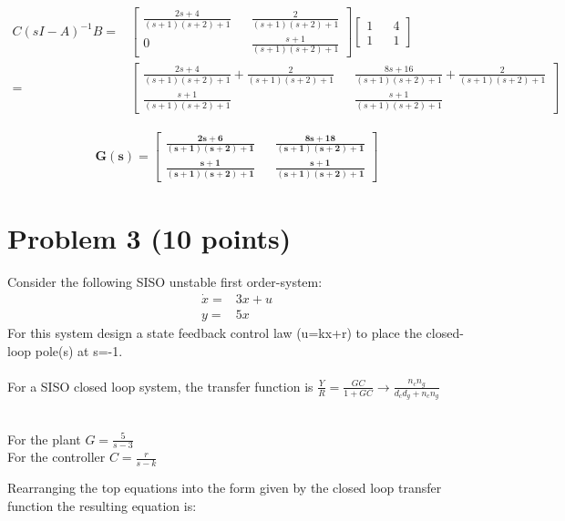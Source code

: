 \documentclass[paper=a4,margin, fontsize=11pt]{scrartcl} %
\numberwithin{equation}{section} %
\numberwithin{figure}{section} %
\numberwithin{table}{section} %
\begin{document}
\begin{align*}
C(sI-A)^{-1}B=&\begin{bmatrix}
\frac{2s+4}{(s+1)(s+2)+1} && \frac{2}{(s+1)(s+2)+1}\\ 0 && \frac{s+1}{(s+1)(s+2)+1}\end{bmatrix}\begin{bmatrix} 1 && 4 \\ 1 && 1\end{bmatrix}\\
=&\begin{bmatrix}
\frac{2s+4}{(s+1)(s+2)+1}+\frac{2}{(s+1)(s+2)+1} && \frac{8s+16}{(s+1)(s+2)+1}+\frac{2}{(s+1)(s+2)+1} \\ \frac{s+1}{(s+1)(s+2)+1} && \frac{s+1}{(s+1)(s+2)+1}\end{bmatrix}
\end{align*}

\begin{align*}
\boldsymbol{G(s)=\begin{bmatrix}
\frac{2s+6}{(s+1)(s+2)+1} && \frac{8s+18}{(s+1)(s+2)+1} \\ \frac{s+1}{(s+1)(s+2)+1} && \frac{s+1}{(s+1)(s+2)+1}\end{bmatrix}}
\end{align*}

\section*{Problem 3 (10 points)}
Consider the following SISO unstable first order-system:
\begin{align*}
\dot{x}=&3x+u\\
y=&5x
\end{align*}
For this system design a state feedback control law (u=kx+r) to place the closed-loop pole(s) at s=-1.\\
\\
For a SISO closed loop system, the transfer function is $\frac{Y}{R}=\frac{GC}{1+GC}\rightarrow\frac{n_cn_g}{d_cd_g+n_cn_g}$\\
\\
\begin{center}
For the plant $G=\frac{5}{s-3}$\\
For the controller $C=\frac{r}{s-k}$
\end{center}
Rearranging the top equations into the form given by the closed loop transfer function the resulting equation is:
\end{document}
